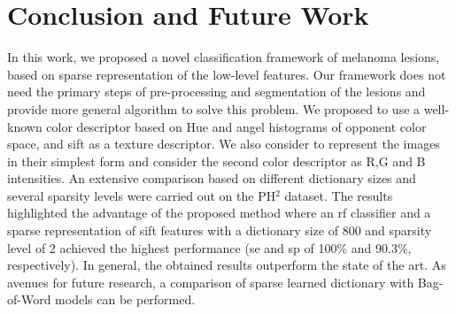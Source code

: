 \section{Conclusion and Future Work}
\label{sec:con}
In this work, we proposed a novel classification framework of melanoma lesions, based on sparse representation of the low-level features. 
Our framework does not need the primary steps of pre-processing and segmentation of the lesions and provide more general algorithm to solve this problem. 
We proposed to use a well-known color descriptor based on Hue and angel histograms of opponent color space, and \ac{sift} as a texture descriptor. 
We also consider to represent the images in their simplest form and consider the second color descriptor as R,G and B intensities.
An extensive comparison based on different dictionary sizes and several sparsity levels were carried out on the PH$^{2}$ dataset. 
The results highlighted the advantage of the proposed method where an \ac{rf} classifier and a sparse representation of \ac{sift} features with a dictionary size of 800 and sparsity level of 2 achieved the highest performance (\ac{se} and \ac{sp} of 100\% and 90.3\%, respectively).
In general, the obtained results outperform the state of the art.
As avenues for future research, a comparison of sparse learned dictionary with Bag-of-Word models can be performed.



